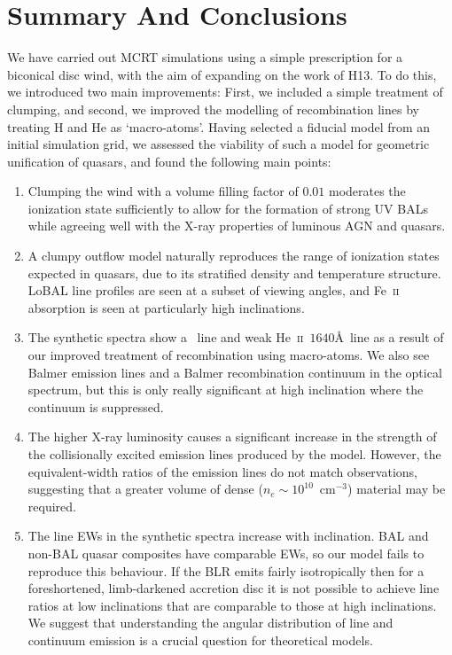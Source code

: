 \documentclass[useAMS,usenatbib]{mn2e_x}
\begin{document}
\section{Summary And Conclusions}

We have carried out MCRT simulations using a simple
prescription for a biconical disc wind, with
the aim of expanding on the work of H13. To do this, we introduced two main
improvements: First, we included a simple treatment of clumping, and second, 
we improved the modelling of recombination lines by treating H and He as
`macro-atoms'. Having selected a fiducial model from an initial simulation grid,
we assessed the viability of such a model for geometric 
unification of quasars, and found the following main points:
\begin{enumerate}
\item Clumping the wind with a volume filling factor of $0.01$ 
moderates the ionization state
sufficiently to allow for the 
formation of strong UV BALs while agreeing well with the X-ray
properties of luminous AGN and quasars. 
\smallskip
\item A clumpy outflow model naturally 
reproduces the range of ionization states
expected in quasars, due to its stratified density
and temperature structure. 
LoBAL line profiles are seen at a subset of viewing angles, and Fe~\textsc{ii}
absorption is seen at particularly high inclinations. 
\smallskip
\item The synthetic spectra show a \la\ line and weak He~\textsc{ii}~$1640$\AA\ line
as a result of our improved treatment of recombination using macro-atoms. We also see
Balmer emission lines and a Balmer recombination continuum in the optical spectrum, but this
is only really significant at high inclination where the continuum is suppressed.  
\smallskip
\item The higher X-ray luminosity causes a significant 
increase in the strength of the collisionally excited emission
lines produced by the model. 
However, the equivalent-width ratios of the emission lines do not match
observations, suggesting that a greater volume of dense ($n_e\sim10^{10}$~cm$^{-3}$)
material may be required.
\bigskip
\item The line EWs in the synthetic spectra increase with inclination.
BAL and non-BAL quasar composites have comparable EWs, so our model
fails to reproduce this behaviour.
 If the BLR emits fairly isotropically then for a 
foreshortened, limb-darkened accretion disc 
it is not possible to achieve line ratios at low inclinations 
that are comparable to those at high inclinations. 
We suggest that understanding the angular distribution of 
line and continuum emission is a crucial question for theoretical models.
\end{enumerate}
\end{document}
